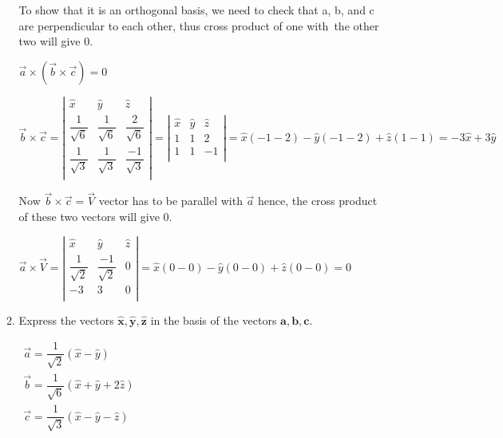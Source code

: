 \documentclass[fleqn]{article}
\begin{document}
\begin{enumerate}
\begin{enumerate}
  \bigbreak
  
  To show that it is an orthogonal basis, we need to check that a, b, and c are perpendicular to each other, thus cross product of one with the other two will give 0.
  
  \bigbreak
  
  $
  \overrightarrow{a}\times(\overrightarrow{b}\times\overrightarrow{c})=0
  $
  
  $
  \overrightarrow{b}\times\overrightarrow{c}
  =
  \left|
  \begin{matrix}
    \hat{x} & \hat{y} & \hat{z} \\
    \dfrac{1}{\sqrt{6}} & \dfrac{1}{\sqrt{6}} & \dfrac{2}{\sqrt{6}} \\ 
    \dfrac{1}{\sqrt{3}} & \dfrac{1}{\sqrt{3}} & \dfrac{-1}{\sqrt{3}} \\ 
  \end{matrix}
  \right|
  =
  \left|
  \begin{matrix}
    \hat{x} & \hat{y} & \hat{z} \\
    1 & 1 & 2 \\ 
    1 & 1 & -1 \\ 
  \end{matrix}
  \right|
  =
  \hat{x}(-1-2)-\hat{y}(-1-2)+\hat{z}(1-1)
  =
  -3\hat{x}+3\hat{y}
  $
  
  Now $\overrightarrow{b}\times\overrightarrow{c}=\overrightarrow{V}$ vector has to be parallel with $\overrightarrow{a}$ hence, the cross product of these two vectors will give 0.
  
  $
  \overrightarrow{a}\times\overrightarrow{V}
  =
  \left|
  \begin{matrix}
    \hat{x} & \hat{y} & \hat{z} \\
    \dfrac{1}{\sqrt{2}} & \dfrac{-1}{\sqrt{2}} & 0  \\ 
    -3 & 3 & 0 \\ 
  \end{matrix}
  \right|
  =
  \hat{x}(0-0)-\hat{y}(0-0)+\hat{z}(0-0)
  =
  0
  $
  
  \item Express the vectors $\mathbf{\hat{x}}, \mathbf{\hat{y}}, \mathbf{\hat{z}}$ in the basis of the vectors $\mathbf{a}, \mathbf{b}, \mathbf{c}$. 
  
  $
  \begin{array}{lll}
    \overrightarrow{a}= \dfrac{1}{\sqrt{2}}(\hat{x}-\hat{y}) \\
    \overrightarrow{b}= \dfrac{1}{\sqrt{6}}(\hat{x}+\hat{y}+2\hat{z}) \\
    \overrightarrow{c}= \dfrac{1}{\sqrt{3}}(\hat{x}-\hat{y}-\hat{z})
    \end{array}  
  $
  

\end{enumerate}
\end{enumerate}
\end{document}
